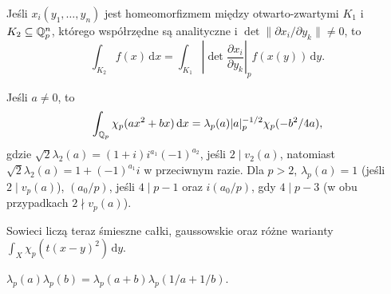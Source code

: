 \begin{fakt}
	Jeśli $x_i(y_1, \ldots, y_n)$ jest homeomorfizmem między otwarto-zwartymi $K_1$ i $K_2 \subseteq \mathbb Q_p^n$, którego współrzędne są analityczne i $\det \|\partial x_i / \partial y_k \| \neq 0$, to \[\int_{K_2} f(x) \,\textrm{d}x =  \int_{K_1} \left| \det \frac{\partial x_i}{\partial y_k} \right|_p f(x(y)) \,\textrm{d}y.\]
\end{fakt}

\begin{fakt}
	Jeśli $a \neq 0$, to
	\[
		\int_{\mathbb Q_p} \chi_p(ax^2 + bx)\,\textrm{d} x = \lambda_p(a) |a|_p^{-1/2} \chi_p(-b^2 / 4a),
	\]
	gdzie $\sqrt 2 \lambda_2(a) = (1+i) i^{a_1} (-1)^{a_2}$, jeśli $2 \mid v_2(a)$, natomiast $\sqrt{2} \lambda_2(a) = 1 + (-1)^{a_1} i$ w przeciwnym razie.
	Dla $p > 2$, $\lambda_p(a) = 1$ (jeśli $2 \mid v_p(a)$), $(a_0/p)$, jeśli $4 \mid p - 1$ oraz $i (a_0/p)$, gdy $4 \mid p - 3$ (w obu przypadkach $2 \nmid v_p(a)$).
\end{fakt}

Sowieci liczą teraz śmieszne całki, gaussowskie oraz różne warianty $\int_X \chi_p (t(x-y)^2) \,\textrm{d}y$.

\begin{fakt}
	$\lambda_p(a) \lambda_p(b) = \lambda_p(a+b) \lambda_p(1/a+1/b)$.
\end{fakt}